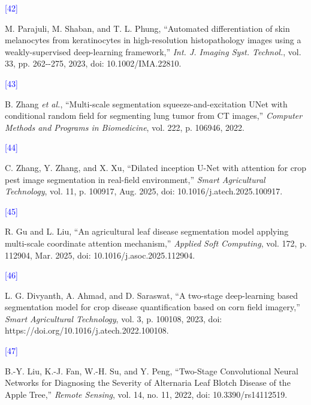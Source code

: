 \documentclass[
]{article}
\begin{document}
\hypertarget{ref:42}{\textcolor{blue}{[42]}} M. Parajuli, M.
Shaban, and T. L. Phung, ``Automated differentiation of skin melanocytes
from keratinocytes in high-resolution histopathology images using a
weakly-supervised deep-learning framework,'' \emph{Int. J. Imaging Syst.
Technol.}, vol. 33, pp. 262-\/-275, 2023, doi:
10.1002/IMA.22810.

\hypertarget{ref:43}{\textcolor{blue}{[43]}} B. Zhang \emph{et al.}, ``Multi-scale segmentation
squeeze-and-excitation UNet with conditional random field for segmenting
lung tumor from CT images,'' \emph{Computer Methods and Programs in
Biomedicine}, vol. 222, p. 106946, 2022.

\hypertarget{ref:44}{\textcolor{blue}{[44]}} C. Zhang, Y. Zhang, and
X. Xu, ``Dilated inception U-Net with attention for crop pest image
segmentation in real-field environment,'' \emph{Smart Agricultural
Technology}, vol. 11, p. 100917, Aug. 2025, doi:
10.1016/j.atech.2025.100917.

\hypertarget{ref:45}{\textcolor{blue}{[45]}} R. Gu and L. Liu, ``An agricultural
leaf disease segmentation model applying multi-scale coordinate
attention mechanism,'' \emph{Applied Soft Computing}, vol. 172, p.
112904, Mar. 2025, doi: 10.1016/j.asoc.2025.112904.

\hypertarget{ref:46}{\textcolor{blue}{[46]}} L. G.
Divyanth, A. Ahmad, and D. Saraswat, ``A two-stage deep-learning based
segmentation model for crop disease quantification based on corn field
imagery,'' \emph{Smart Agricultural Technology}, vol. 3, p. 100108,
2023, doi: https://doi.org/10.1016/j.atech.2022.100108.

\hypertarget{ref:47}{\textcolor{blue}{[47]}} B.-Y.
Liu, K.-J. Fan, W.-H. Su, and Y. Peng, ``Two-Stage Convolutional Neural
Networks for Diagnosing the Severity of Alternaria Leaf Blotch Disease
of the Apple Tree,'' \emph{Remote Sensing}, vol. 14, no. 11, 2022, doi:
10.3390/rs14112519.
\end{document}

